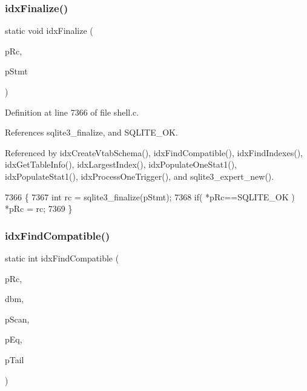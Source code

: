 \subsubsection{idx\+Finalize()}
{\footnotesize\ttfamily static void idx\+Finalize (\begin{DoxyParamCaption}\item[{int $\ast$}]{p\+Rc,  }\item[{\textbf{ sqlite3\+\_\+stmt} $\ast$}]{p\+Stmt }\end{DoxyParamCaption})\hspace{0.3cm}{\ttfamily [static]}}



Definition at line 7366 of file shell.\+c.



References sqlite3\+\_\+finalize, and S\+Q\+L\+I\+T\+E\+\_\+\+OK.



Referenced by idx\+Create\+Vtab\+Schema(), idx\+Find\+Compatible(), idx\+Find\+Indexes(), idx\+Get\+Table\+Info(), idx\+Largest\+Index(), idx\+Populate\+One\+Stat1(), idx\+Populate\+Stat1(), idx\+Process\+One\+Trigger(), and sqlite3\+\_\+expert\+\_\+new().


\begin{DoxyCode}
7366                                                       \{
7367   \textcolor{keywordtype}{int} rc = sqlite3_finalize(pStmt);
7368   \textcolor{keywordflow}{if}( *pRc==SQLITE_OK ) *pRc = rc;
7369 \}
\end{DoxyCode}
\mbox{\label{shell_8c_ada20aaac7524a883e626dba2a50b0068}} 
\subsubsection{idx\+Find\+Compatible()}
{\footnotesize\ttfamily static int idx\+Find\+Compatible (\begin{DoxyParamCaption}\item[{int $\ast$}]{p\+Rc,  }\item[{\textbf{ sqlite3} $\ast$}]{dbm,  }\item[{\textbf{ Idx\+Scan} $\ast$}]{p\+Scan,  }\item[{\textbf{ Idx\+Constraint} $\ast$}]{p\+Eq,  }\item[{\textbf{ Idx\+Constraint} $\ast$}]{p\+Tail }\end{DoxyParamCaption})\hspace{0.3cm}{\ttfamily [static]}}



